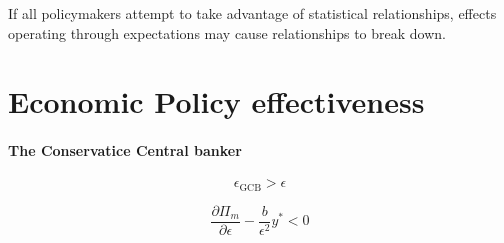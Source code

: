 If all policymakers attempt to take advantage of statistical relationships, effects operating through expectations may cause relationships to break down. 


\section{Economic Policy effectiveness}

\paragraph{The Conservatice Central banker}

$$
\epsilon_{\text{GCB}} > \epsilon
$$

$$
\frac{\partial \Pi_m}{\partial \epsilon} - \frac{b}{\epsilon^2}y^* < 0
$$




